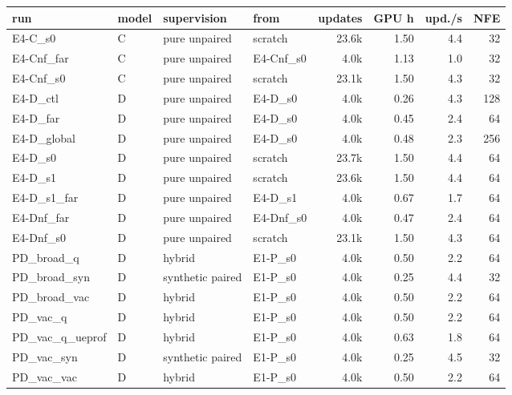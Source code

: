 \scriptsize
\setlength{\tabcolsep}{3pt}
\begin{tabular}{llllrrrr}
\toprule
run & model & supervision & from & updates & GPU h & upd./s & NFE \\
\midrule
E4-C\_s0 & C & pure unpaired & scratch & 23.6k & 1.50 & 4.4 & 32 \\
E4-Cnf\_far & C & pure unpaired & E4-Cnf\_s0 & 4.0k & 1.13 & 1.0 & 32 \\
E4-Cnf\_s0 & C & pure unpaired & scratch & 23.1k & 1.50 & 4.3 & 32 \\
E4-D\_ctl & D & pure unpaired & E4-D\_s0 & 4.0k & 0.26 & 4.3 & 128 \\
E4-D\_far & D & pure unpaired & E4-D\_s0 & 4.0k & 0.45 & 2.4 & 64 \\
E4-D\_global & D & pure unpaired & E4-D\_s0 & 4.0k & 0.48 & 2.3 & 256 \\
E4-D\_s0 & D & pure unpaired & scratch & 23.7k & 1.50 & 4.4 & 64 \\
E4-D\_s1 & D & pure unpaired & scratch & 23.6k & 1.50 & 4.4 & 64 \\
E4-D\_s1\_far & D & pure unpaired & E4-D\_s1 & 4.0k & 0.67 & 1.7 & 64 \\
E4-Dnf\_far & D & pure unpaired & E4-Dnf\_s0 & 4.0k & 0.47 & 2.4 & 64 \\
E4-Dnf\_s0 & D & pure unpaired & scratch & 23.1k & 1.50 & 4.3 & 64 \\
PD\_broad\_q & D & hybrid & E1-P\_s0 & 4.0k & 0.50 & 2.2 & 64 \\
PD\_broad\_syn & D & synthetic paired & E1-P\_s0 & 4.0k & 0.25 & 4.4 & 32 \\
PD\_broad\_vac & D & hybrid & E1-P\_s0 & 4.0k & 0.50 & 2.2 & 64 \\
PD\_vac\_q & D & hybrid & E1-P\_s0 & 4.0k & 0.50 & 2.2 & 64 \\
PD\_vac\_q\_ueprof & D & hybrid & E1-P\_s0 & 4.0k & 0.63 & 1.8 & 64 \\
PD\_vac\_syn & D & synthetic paired & E1-P\_s0 & 4.0k & 0.25 & 4.5 & 32 \\
PD\_vac\_vac & D & hybrid & E1-P\_s0 & 4.0k & 0.50 & 2.2 & 64 \\
\bottomrule
\end{tabular}
